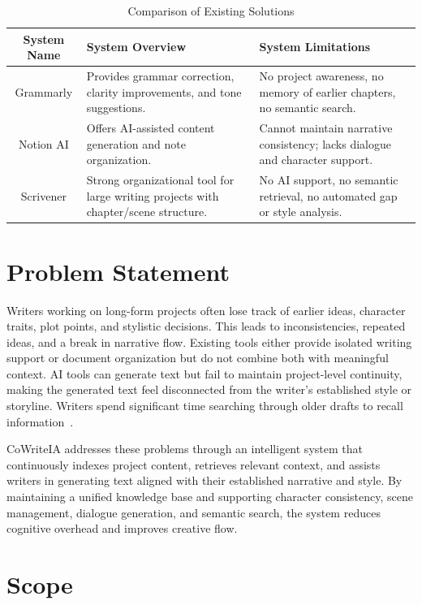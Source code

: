 \begin{table}[H]
\centering
\caption{Comparison of Existing Solutions}
\begin{tabular}{|c|p{5cm}|p{5cm}|}
\hline
\textbf{System Name} & \textbf{System Overview} & \textbf{System Limitations} \\ \hline
Grammarly & Provides grammar correction, clarity improvements, and tone suggestions. & No project awareness, no memory of earlier chapters, no semantic search. \\ \hline
Notion AI & Offers AI-assisted content generation and note organization. & Cannot maintain narrative consistency; lacks dialogue and character support. \\ \hline
Scrivener & Strong organizational tool for large writing projects with chapter/scene structure. & No AI support, no semantic retrieval, no automated gap or style analysis. \\ \hline
\end{tabular}
\label{tab:system_comparison}
\end{table}

\section{Problem Statement}

Writers working on long-form projects often lose track of earlier ideas, character traits, plot points, and stylistic decisions. This leads to inconsistencies, repeated ideas, and a break in narrative flow. Existing tools either provide isolated writing support or document organization but do not combine both with meaningful context. AI tools can generate text but fail to maintain project-level continuity, making the generated text feel disconnected from the writer's established style or storyline. Writers spend significant time searching through older drafts to recall information~\cite{guu2020realm,lewis2020rag}.

CoWriteIA addresses these problems through an intelligent system that continuously indexes project content, retrieves relevant context, and assists writers in generating text aligned with their established narrative and style. By maintaining a unified knowledge base and supporting character consistency, scene management, dialogue generation, and semantic search, the system reduces cognitive overhead and improves creative flow.

\section{Scope}

